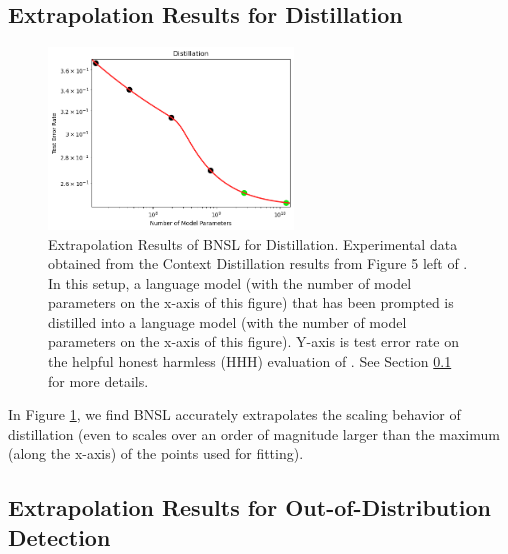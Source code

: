 \documentclass{article} %
\begin{document}
\vspace{5.0mm}

\subsection{Extrapolation Results for Distillation}
\label{section:distillation}

\begin{figure}[htbp]
    \centering
\includegraphics[width=0.58\textwidth]{figures/distillation/distillation.png}
    \caption{
Extrapolation Results of BNSL for Distillation. Experimental data obtained from the Context Distillation results from Figure 5 left of \cite{bai2022training}. In this setup, a language model (with the number of model parameters on the x-axis of this figure) that has been prompted is distilled into a language model (with the number of model parameters on the x-axis of this figure). Y-axis is test error rate on the helpful honest harmless (HHH) evaluation of \cite{askell2021general}. See Section \ref{section:distillation} for more details.
    }
    \label{fig:distillation}
\end{figure}

In Figure \ref{fig:distillation}, we find BNSL accurately extrapolates the scaling behavior of distillation (even to scales over an order of magnitude larger than the maximum (along the x-axis) of the points used for fitting).

\clearpage

\subsection{Extrapolation Results for Out-of-Distribution Detection}
\label{section:ood_detection}
\end{document}
